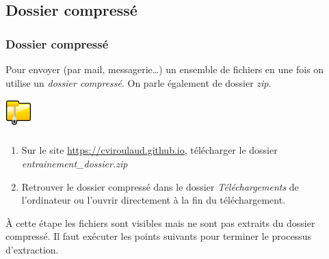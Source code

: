 \documentclass[svgnames,11pt]{beamer}
\begin{document}
\subsection{Dossier compressé}
\begin{frame}
    \frametitle{Dossier compressé}

    Pour envoyer  (par mail, messagerie\dots) un ensemble de fichiers en une fois on utilise un \emph{dossier compressé}. On parle également de dossier \emph{zip}.
    \begin{center}
    \centering
    \includegraphics[width=1cm]{ressources/zip.png}
    \label{IMG}
    \end{center}

\end{frame}
\begin{frame}
    \frametitle{}

    \begin{activite}
    \begin{enumerate}
        \item Sur le site \url{https://cviroulaud.github.io}, télécharger le dossier \emph{entrainement\_dossier.zip}
        \item Retrouver le dossier compressé dans le dossier \emph{Téléchargements} de l'ordinateur ou l'ouvrir directement à la fin du téléchargement.
        
        
    \end{enumerate}
    \end{activite}
    \begin{aretenir}[]
        À cette étape les fichiers sont visibles mais ne sont pas extraits du dossier compressé. Il faut exécuter les points suivants pour terminer le processus d'extraction.
        \end{aretenir}
\end{frame}
\end{document}
